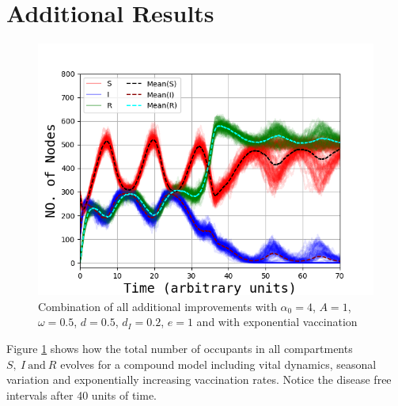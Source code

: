 \appendix

\section{Additional Results}

\begin{figure}[H]
	\centering
		\includegraphics[width=\linewidth]{Figures/All_A1_w05_d05_di02_exp.png}
		\caption{Combination of all additional improvements with $\alpha_0 = 4$, $A = 1$, $\omega = 0.5$, $d = 0.5$, $d_I = 0.2$, $e = 1$ and with exponential vaccination}
	\label{fig:All}
	\end{figure}
Figure \ref{fig:All} shows how the total number of occupants in all compartments $S, \ I \ \text{and} \ R$ evolves for a compound model including vital dynamics, seasonal variation and exponentially increasing vaccination rates. Notice the disease free intervals after 40 units of time. 
	
